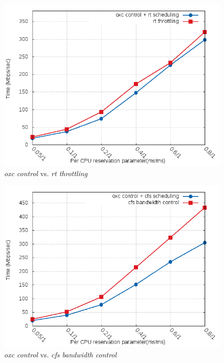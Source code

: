 \begin{figure}[htbp]
        \centering
        \includegraphics[width=\textwidth]{images/expB1}
        \caption{\emph{oxc control} vs. \emph{rt throttling}}
        \label{fig:expB1}
\end{figure}
\begin{figure}[htbp]
        \centering
        \includegraphics[width=\textwidth]{images/expB2}
        \caption{\emph{oxc control} vs. \emph{cfs bandwidth control}}
        \label{fig:expB2}
\end{figure}
